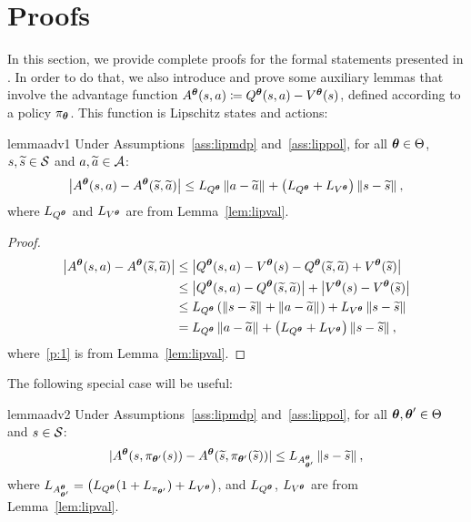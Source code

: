 \section{Proofs} \label{sec:proo}
In this section, we provide complete proofs for the formal statements presented in . In order to do that, we also introduce and prove some auxiliary lemmas that involve the advantage function $A^{\boldsymbol{\theta}}(s,a)\coloneqq Q^{\boldsymbol{\theta}}(s,a) - V^{\boldsymbol{\theta}}(s)$, defined according to a policy $\pi_{\boldsymbol{\theta}}$. This function is Lipschitz \wrt states and actions:
\begin{restatable}{lemma}{adv1}\label{lem:adv1}
	Under Assumptions~\ref{ass:lipmdp} and~\ref{ass:lippol}, for all $\boldsymbol{\theta}\in\Theta$, $s,\widetilde{s}\in\mathcal{S}$ and $a,\widetilde{a}\in\mathcal{A}$:
	\begin{align*}
	\left|A^{\boldsymbol{\theta}}(s,a) - A^{\boldsymbol{\theta}}(\widetilde{s},\widetilde{a})\right| \leq L_{Q^{\boldsymbol{\theta}}}\left\|a-\widetilde{a}\right\|_{} + \left(L_{Q^{\boldsymbol{\theta}}} + L_{V^{\boldsymbol{\theta}}}\right)\left\|s-\widetilde{s}\right\|_{},
	\end{align*}
	where $L_{Q^{\boldsymbol{\theta}}}$ and $L_{V^{\boldsymbol{\theta}}}$ are from Lemma~\ref{lem:lipval}.
\end{restatable}
\begin{proof}
	\begin{align}
	\left|A^{\boldsymbol{\theta}}(s,a) - A^{\boldsymbol{\theta}}(\widetilde{s},\widetilde{a})\right| &\leq \left|Q^{\boldsymbol{\theta}}(s,a) - V^{\boldsymbol{\theta}}(s) - Q^{\boldsymbol{\theta}}(\widetilde{s},\widetilde{a}) + V^{\boldsymbol{\theta}}(\widetilde{s})\right| \nonumber\\
	&\leq \left|Q^{\boldsymbol{\theta}}(s,a) - Q^{\boldsymbol{\theta}}(\widetilde{s},\widetilde{a})\right| + \left|V^{\boldsymbol{\theta}}(s) - V^{\boldsymbol{\theta}}(\widetilde{s})\right| \nonumber\\
	&\leq L_{Q^{\boldsymbol{\theta}}}\left(\left\|s-\widetilde{s}\right\|_{} + \left\|a-\widetilde{a}\right\|_{}\right) + L_{V^{\boldsymbol{\theta}}}\left\|s-\widetilde{s}\right\|_{} \label{p:1}\\
	&=L_{Q^{\boldsymbol{\theta}}}\left\|a-\widetilde{a}\right\|_{} + \left(L_{Q^{\boldsymbol{\theta}}} + L_{V^{\boldsymbol{\theta}}}\right)\left\|s-\widetilde{s}\right\|_{}\nonumber,
	\end{align}
	where~\eqref{p:1} is from Lemma~\ref{lem:lipval}.
\end{proof}
\noindent The following special case will be useful:
\begin{restatable}{lemma}{adv2}\label{lem:adv2}
	Under Assumptions~\ref{ass:lipmdp} and~\ref{ass:lippol}, for all $\boldsymbol{\theta},\boldsymbol{\theta}'\in\Theta$ and $s\in\mathcal{S}$:
	\begin{align*}
	|A^{\boldsymbol{\theta}}(s,\pi_{\boldsymbol{\theta}'}(s)) - A^{\boldsymbol{\theta}}(\widetilde{s},\pi_{\boldsymbol{\theta}'}(\widetilde{s}))| \leq L_{A^{\boldsymbol{\theta}}_{\boldsymbol{\theta}'}}\left\|s-\widetilde{s}\right\|_{},
	\end{align*}
	where $L_{A^{\boldsymbol{\theta}}_{\boldsymbol{\theta}'}}=\left(L_{Q^{\boldsymbol{\theta}}}(1 + L_{\pi_{\boldsymbol{\theta}'}}) + L_{V^{\boldsymbol{\theta}}}\right)$, and $L_{Q^{\boldsymbol{\theta}}}$, $L_{V^{\boldsymbol{\theta}}}$ are from Lemma~\ref{lem:lipval}.
\end{restatable}
